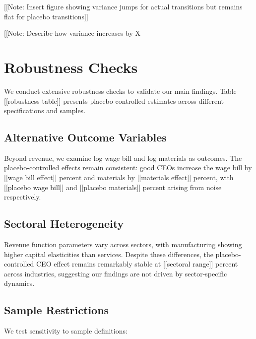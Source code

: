 \documentclass[11pt,a4paper]{article}
\begin{document}
[[Note: Insert figure showing variance jumps for actual transitions but remains flat for placebo transitions]]

[[Note: Describe how variance increases by X%

\section{Robustness Checks}

We conduct extensive robustness checks to validate our main findings. Table [[robustness table]] presents placebo-controlled estimates across different specifications and samples.

\subsection{Alternative Outcome Variables}

Beyond revenue, we examine log wage bill and log materials as outcomes. The placebo-controlled effects remain consistent: good CEOs increase the wage bill by [[wage bill effect]] percent and materials by [[materials effect]] percent, with [[placebo wage bill]] and [[placebo materials]] percent arising from noise respectively.

\subsection{Sectoral Heterogeneity}

Revenue function parameters vary across sectors, with manufacturing showing higher capital elasticities than services. Despite these differences, the placebo-controlled CEO effect remains remarkably stable at [[sectoral range]] percent across industries, suggesting our findings are not driven by sector-specific dynamics.

\subsection{Sample Restrictions}

We test sensitivity to sample definitions:
\end{document}
